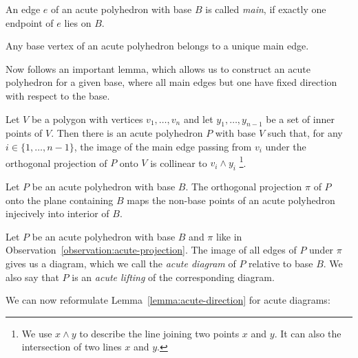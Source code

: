 \begin{definition}
  An edge $e$ of an acute polyhedron with base $B$ is called \emph{main}, if exactly one endpoint of $e$ lies on $B$.
\end{definition}

\begin{lemma}
  Any base vertex of an acute polyhedron belongs to a unique main edge.
\end{lemma}

Now follows an important lemma, which allows us to construct an acute polyhedron for a given base, where all main edges but one have fixed direction with respect to the base.
\begin{lemma}\label{lemma:acute-direction}
  Let $V$ be a polygon with vertices $v_1,\dots,v_n$ and let $y_1,\dots,y_{n-1}$ be a set of inner points of $V$.
  Then there is an acute polyhedron $P$ with base $V$ such that, for any $i \in \{1,\dots,n-1\}$, the image of the main edge passing from $v_i$ under the orthogonal projection of $P$ onto $V$ is collinear to $v_i \wedge y_i$ \footnote{We use $x \wedge y$ to describe the line joining two points $x$ and $y$. It can also the intersection of two lines $x$ and $y$.}.
\end{lemma}

\begin{observation}\label{observation:acute-projection}
  Let $P$ be an acute polyhedron with base $B$.
  The orthogonal projection $\pi$ of $P$ onto the plane containing $B$ maps the non-base points of an acute polyhedron injecively into interior of $B$.
\end{observation}

\begin{definition}
  Let $P$ be an acute polyhedron with base $B$ and $\pi$ like in Observation~\ref{observation:acute-projection}.
  The image of all edges of $P$ under $\pi$ gives us a diagram, which we call the \emph{acute diagram} of $P$ relative to base $B$. 
  We also say that $P$ is an \emph{acute lifting} of the corresponding diagram.
\end{definition}

We can now reformulate Lemma~\ref{lemma:acute-direction} for acute diagrams:

